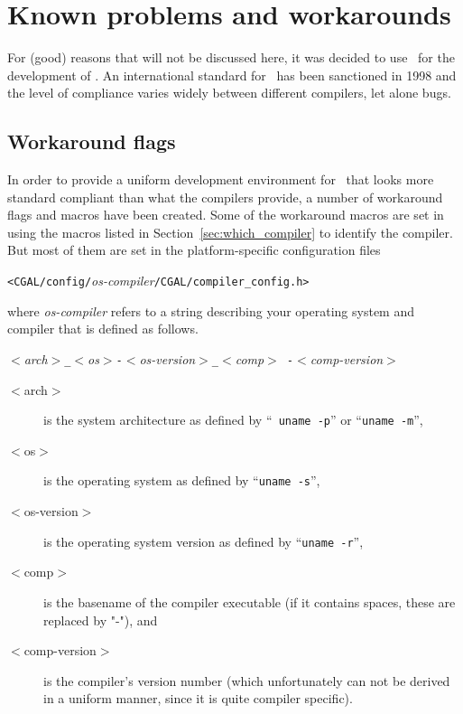 \section{Known problems and workarounds\label{sec:problems_and_workarounds}}

For (good) reasons that will not be discussed here, it was decided to
use \CC\ for the development of \cgal. An international standard for
\CC\ has been sanctioned in 1998 \cite{cgal:ansi-is14882-98} and the
level of compliance varies widely between different
compilers, let alone bugs.

\subsection{Workaround flags\label{sec:workaround_flags}}

In order to provide a uniform development environment for \cgal\ that
looks more standard compliant than what the compilers provide, a number
of workaround flags and macros have been created.  Some of the
workaround macros are set in 
using the macros 
listed in Section~\ref{sec:which_compiler} to identify the compiler. 
But most of them are set in the platform-specific configuration files
\begin{center}
\texttt{<CGAL/config/}{\em os-compiler}\texttt{/CGAL/compiler\_config.h>}
\end{center}
where \textit{os-compiler} refers to a string describing your
operating system and compiler that is defined as follows.

\begin{center}
  \textit{$<$arch$>$\texttt{\_}$<$os$>$\texttt{-}$<$os-version$>$\texttt{\_}$<$comp$>${\tt
      -}$<$comp-version$>$}
\end{center}

\begin{description}
\item[$<$arch$>$] is the system architecture as defined by ``{\tt
    uname -p}'' or ``\texttt{uname -m}'',
\item[$<$os$>$] is the operating system as defined by ``\texttt{uname
    -s}'',
\item[$<$os-version$>$] is the operating system version as defined by
  ``\texttt{uname -r}'',
\item[$<$comp$>$] is the basename of the compiler executable (if it
  contains spaces, these are replaced by "-"), and
\item[$<$comp-version$>$] is the compiler's version number (which
  unfortunately can not be derived in a uniform manner, since it is
  quite compiler specific).
\end{description}


